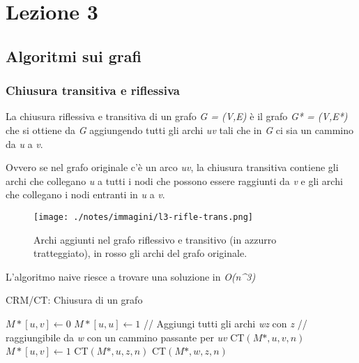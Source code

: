 \chapter{Lezione 3}
	
\section{Algoritmi sui grafi}\label{lezione-3---algoritmi-sui-grafi}

\subsection{Chiusura transitiva e riflessiva}\label{chiusura-transitiva-e-riflessiva}

La chiusura riflessiva e transitiva di un grafo \emph{G = (V,E)} è il
grafo \emph{G* = (V,E*)} che si ottiene da \emph{G} aggiungendo tutti
gli archi \emph{uv} tali che in \emph{G} ci sia un cammino da \emph{u} a
\emph{v}.

Ovvero se nel grafo originale c'è un arco \emph{uv}, la chiusura
transitiva contiene gli archi che collegano \emph{u} a tutti i nodi che
possono essere raggiunti da \emph{v} e gli archi che collegano i nodi
entranti in \emph{u} a \emph{v}.

\begin{figure}[htbp]
\centering
\texttt{[image: ./notes/immagini/l3-rifle-trans.png]}
\caption{Archi aggiunti nel grafo riflessivo e transitivo (in azzurro
tratteggiato), in rosso gli archi del grafo originale.}
\end{figure}

L'algoritmo naive riesce a trovare una soluzione in \emph{O(n\^{}3)}

\begin{breakablealgorithm}
	\caption{CRM/CT: Chiusura di un grafo}
	\begin{algorithmic}[1]
					\State $M*[u,v] \gets 0$
				\EndFor
			\EndFor
				\State $M*[u,u] \gets 1$
			\EndFor
				\State // Aggiungi tutti gli archi \textit{wz} con \textit{z}
				\State // raggiungibile da \textit{w} con un cammino passante per \textit{uv}
				\State \textsc{CT}$(M*,u,v,n)$
				\EndFor
			\EndFor
		\EndFunction
		\Statex
			\State $M*[u,v] \gets 1$
					\State \textsc{CT}$(M*, u, z, n)$
				\EndIf
			\EndFor
					\State \textsc{CT}$(M*, w, z, n)$
				\EndIf
			\EndFor
		\EndFunction
	\end{algorithmic}
\end{breakablealgorithm}

